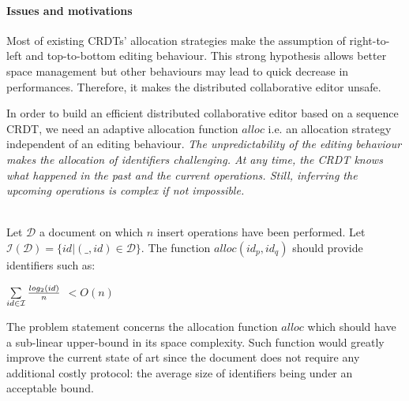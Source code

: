 \paragraph{Issues and motivations}
Most of existing CRDTs' allocation strategies make the assumption of
right-to-left and top-to-bottom editing behaviour. This strong hypothesis
allows better space management but other behaviours may lead to quick decrease
in performances. Therefore, it makes the distributed collaborative editor
unsafe.

In order to build an efficient distributed collaborative editor based on a
sequence CRDT, we need an adaptive allocation function $alloc$ i.e. an
allocation strategy independent of an editing behaviour. \emph{The
  unpredictability of the editing behaviour makes the allocation of identifiers
  challenging. At any time, the CRDT knows what happened in the past and the
  current operations. Still, inferring the upcoming operations is complex if
  not impossible.}

\begin{Def}\ \\
Let $\mathcal{D}$ a document on which $n$ insert operations have been
performed.  Let $\mathcal{I}(\mathcal{D})= \{id |
(\_,id)\in{\mathcal{D}}\}$. The function $alloc(id_p,id_q)$ should provide
identifiers such as:
\begin{center}
$\sum\limits_{id \in \mathcal{I}} { {log_2(id)}\over{n}}$ $< O(n)$
\end{center}
\end{Def}

The problem statement concerns the allocation function $alloc$ which
should have a sub-linear upper-bound in its space complexity. Such
function would greatly improve the current state of art since the
document does not require any additional costly protocol: the average
size of identifiers being under an acceptable bound.
